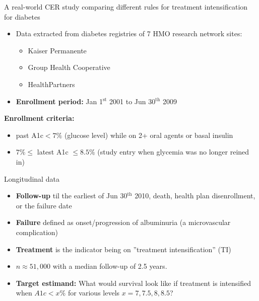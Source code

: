 \documentclass[t]{beamer}
\begin{document}
\begin{frame}{A real-world CER study comparing different rules for treatment intensification for diabetes}
\begin{itemize}
\item Data extracted from diabetes registries of 7 HMO research network sites:
\begin{itemize}
\item Kaiser Permanente
\item Group Health Cooperative
\item HealthPartners
\end{itemize}
\item  {\bf Enrollment period:} Jan 1$^{\textrm{st}}$ 2001 to Jun 30$^{\textrm{th}}$ 2009
\end{itemize}
 {\bf Enrollment criteria:} \\
\vspace{-0.2cm}\begin{itemize}
\item past A1c$<7\%$ (glucose level) while on 2+ oral agents or basal insulin
\item $7\%\leq$ latest A1c $\leq 8.5\%$  (study entry when glycemia was no longer reined in)
\end{itemize}
\end{frame}
\begin{frame}{Longitudinal data}

\begin{itemize}
\item {\bf Follow-up} til the earliest of Jun 30$^{\textrm{th}}$ 2010, death, health plan disenrollment, or the failure date
\item {\bf Failure} defined as onset/progression of albuminuria (a microvascular complication)
\item {\bf Treatment} is the indicator being on ''treatment intensification'' (TI)
\item $n\approx 51,000$ with a median follow-up of 2.5 years.
\item {\bf Target estimand:} What would survival look like if treatment is intensified when $A1c<x\%$ for various levels $x=7,7.5,8,8.5$?
\end{itemize}
\end{frame}
\end{document}
